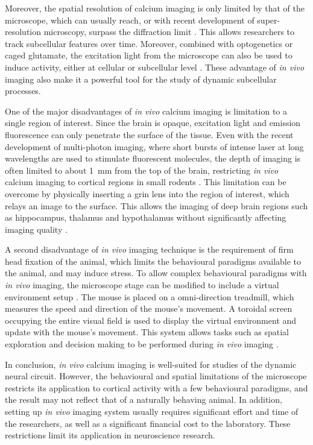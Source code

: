 Moreover, the spatial resolution of calcium imaging is only limited by that of the microscope, which can usually reach, or with recent development of super-resolution microscopy, surpass the diffraction limit \citep{dudok15}. This allows researchers to track subcellular features over time. Moreover, combined with optogenetics or caged glutamate, the excitation light from the microscope can also be used to induce activity, either at cellular or subcellular level \citep{kantevari10, noguchi11, prakash12}. These advantage of \textit{in vivo} imaging also make it a powerful tool for the study of dynamic subcellular processes. 

One of the major disadvantages of \textit{in vivo} calcium imaging is limitation to a single region of interest. Since the brain is opaque, excitation light and emission fluorescence can only penetrate the surface of the tissue. Even with the recent development of multi-photon imaging, where short bursts of intense laser at long wavelengths are used to stimulate fluorescent molecules, the depth of imaging is often limited to about \SI{1}{\mm} from the top of the brain, restricting \textit{in vivo} calcium imaging to cortical regions in small rodents \citep{horton13, yang17}. This limitation can be overcome by physically inserting a \gls{grin} lens into the region of interest, which relays an image to the surface. This allows the imaging of deep brain regions such as hippocampus, thalamus and hypothalamus without significantly affecting imaging quality \citep{attardo15}.

A second disadvantage of \textit{in vivo} imaging technique is the requirement of firm head fixation of the animal, which limits the behavioural paradigms available to the animal, and may induce stress. To allow complex behavioural paradigms with \textit{in vivo} imaging, the microscope stage can be modified to include a virtual environment setup \citep{harvey09}. The mouse is placed on a omni-direction treadmill, which measures the speed and direction of the mouse's movement. A toroidal screen occupying the entire visual field is used to display the virtual environment and update with the mouse's movement. This system allows tasks such as spatial exploration and decision making to be performed during \textit{in vivo} imaging \citep{harvey09, harvey12}. 

In conclusion, \textit{in vivo} calcium imaging is well-suited for studies of the dynamic neural circuit. However, the behavioural and spatial limitations of the microscope restricts its application to cortical activity with a few behavioural paradigms, and the result may not reflect that of a naturally behaving animal. In addition, setting up \textit{in vivo} imaging system usually requires significant effort and time of the researchers, as well as a significant financial cost to the laboratory. These restrictions limit its application in neuroscience research. 

